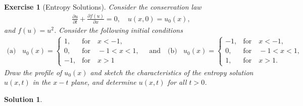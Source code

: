 \documentclass[10pt,letterpaper]{article}
\theoremstyle{break}
\newtheorem{exercise}{Exercise}
\newtheorem{solution}{Solution}
\begin{document}
\begin{exercise}[Entropy Solutions]
    Consider the conservation law 
    \begin{align}
    	\frac{\partial u}{\partial t}
    	+
    	\frac{\partial f(u)}{\partial x}
    	= 0,
    	\quad
    	u(x,0)=u_0(x),
    \end{align}
    and $f(u) = u^2$.
    Consider the following initial conditions
    \begin{align}
    	\text{(a)}
    	\,\,\;\;
    	u_0(x) = 
    	\left\{
    	\begin{array}{cl}
    	1, & \text{for} \quad x<-1,\\
    	0, &\text{for} \quad -1<x< 1,\\
    	-1, &\text{for} \quad x > 1
    	\end{array}
    	\right.
    	\quad
    	\text{and}
    	\quad
    	\text{(b)}
    	\,\,\;\;
    	u_0(x) = 
    	\left\{
    	\begin{array}{cl}
    	-1, & \text{for} \quad x<-1,\\
    	0, &\text{for} \quad -1<x < 1, \\
    	1, &\text{for} \quad x > 1.
    	\end{array}
    	\right.
    \end{align}
    Draw the profile of $u_0(x)$ and sketch the characteristics
    of the entropy solution $u(x,t)$ in the $x-t$ plane, and
    determine $u(x,t)$ for all $t > 0$.
\end{exercise}

\begin{solution}
    
\end{solution}
\end{document}
